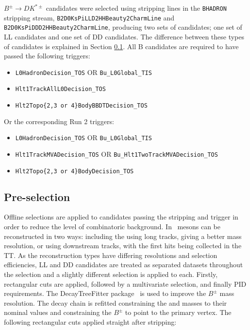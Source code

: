 $B^{\pm} \to DK^{*\pm}$ candidates were selected using stripping lines in the {\tt BHADRON} stripping stream, {\tt B2D0KsPiLLD2HHBeauty2CharmLine} and {\tt B2D0KsPiDDD2HHBeauty2CharmLine}, producing two sets of candidates; one set of LL candidates and one set of DD candidates. The difference between these types of candidates is explained in Section \ref{sec:selection:pre-selection}. All B candidates are required to have passed the following triggers:
%
\begin{itemize}
\item {\tt L0HadronDecision\_TOS} OR {\tt Bu\_L0Global\_TIS}
\item \tt Hlt1TrackAllL0Decision\_TOS
\item \tt Hlt2Topo\{2,3 or 4\}BodyBBDTDecision\_TOS
\end{itemize}
%
Or the corresponding Run 2 triggers:

\begin{itemize}
\item {\tt L0HadronDecision\_TOS} OR {\tt Bu\_L0Global\_TIS}
\item {\tt Hlt1TrackMVADecision\_TOS} OR {\tt Bu\_Hlt1TwoTrackMVADecision\_TOS}
\item \tt Hlt2Topo\{2,3 or 4\}BodyDecision\_TOS
\end{itemize}

\subsection{Pre-selection}
\label{sec:selection:pre-selection}

Offline selections are applied to candidates passing the stripping and trigger in order to reduce the level of combinatoric background. In \lhcb\ \KS mesons can be reconstructed in two ways: including the \velo using long tracks, giving a better mass resolution, or using downstream tracks, with the first hits being collected in the TT. As the \KS reconstruction types have differing resolutions and selection efficiencies, LL and DD candidates are treated as separated datasets throughout the selection and a slightly different selection is applied to each. Firstly, rectangular cuts are applied, followed by a multivariate selection, and finally PID requirements. The DecayTreeFitter package~\cite{Hulsbergen:2005pu} is used to improve the $B^{\pm}$ mass resolution. The decay chain is refitted constraining the \Dz and \KS masses to their nominal values and constraining the $B^{\pm}$ to point to the primary vertex. The following rectangular cuts applied straight after stripping:

